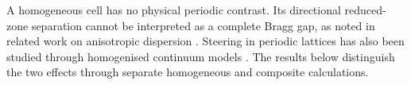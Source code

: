 {\sloppy
A homogeneous cell has no physical periodic contrast. Its directional reduced-zone separation cannot be interpreted as a complete Bragg gap, as noted in related work on anisotropic dispersion \cite{WangMaznevLaude2016}. Steering in periodic lattices has also been studied through homogenised continuum models \cite{RosiAuffray2019}. The results below distinguish the two effects through separate homogeneous and composite calculations.
\par}

